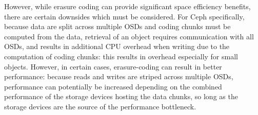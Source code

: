 However, while erasure coding can provide significant space efficiency benefits, there are certain downsides which must be considered. For Ceph specifically, because data are split across multiple \acp{OSD} and coding chunks must be computed from the data, retrieval of an object requires communication with all \acp{OSD}, and results in additional \ac{CPU} overhead when writing due to the computation of coding chunks: this results in overhead especially for small objects. However, in certain cases, erasure-coding can result in better performance: because reads and writes are striped across multiple \acp{OSD}, performance can potentially be increased depending on the combined performance of the storage devices hosting the data chunks, so long as the storage devices are the source of the performance bottleneck.



\medskip